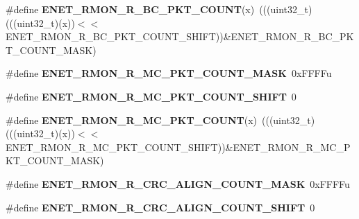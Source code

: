 \begin{DoxyCompactItemize}
\item 
\#define {\bfseries E\+N\+E\+T\+\_\+\+R\+M\+O\+N\+\_\+\+R\+\_\+\+B\+C\+\_\+\+P\+K\+T\+\_\+\+C\+O\+U\+NT}(x)~(((uint32\+\_\+t)(((uint32\+\_\+t)(x))$<$$<$E\+N\+E\+T\+\_\+\+R\+M\+O\+N\+\_\+\+R\+\_\+\+B\+C\+\_\+\+P\+K\+T\+\_\+\+C\+O\+U\+N\+T\+\_\+\+S\+H\+I\+FT))\&E\+N\+E\+T\+\_\+\+R\+M\+O\+N\+\_\+\+R\+\_\+\+B\+C\+\_\+\+P\+K\+T\+\_\+\+C\+O\+U\+N\+T\+\_\+\+M\+A\+SK)\hypertarget{group__ENET__Register__Masks_gad997cfc2457658dabbd489f83129f403}{}\label{group__ENET__Register__Masks_gad997cfc2457658dabbd489f83129f403}

\item 
\#define {\bfseries E\+N\+E\+T\+\_\+\+R\+M\+O\+N\+\_\+\+R\+\_\+\+M\+C\+\_\+\+P\+K\+T\+\_\+\+C\+O\+U\+N\+T\+\_\+\+M\+A\+SK}~0x\+F\+F\+F\+Fu\hypertarget{group__ENET__Register__Masks_gaffc93969b103038343e11847c1dd49f0}{}\label{group__ENET__Register__Masks_gaffc93969b103038343e11847c1dd49f0}

\item 
\#define {\bfseries E\+N\+E\+T\+\_\+\+R\+M\+O\+N\+\_\+\+R\+\_\+\+M\+C\+\_\+\+P\+K\+T\+\_\+\+C\+O\+U\+N\+T\+\_\+\+S\+H\+I\+FT}~0\hypertarget{group__ENET__Register__Masks_ga2bd574ecd5d63b6c391f9db9c33a22f6}{}\label{group__ENET__Register__Masks_ga2bd574ecd5d63b6c391f9db9c33a22f6}

\item 
\#define {\bfseries E\+N\+E\+T\+\_\+\+R\+M\+O\+N\+\_\+\+R\+\_\+\+M\+C\+\_\+\+P\+K\+T\+\_\+\+C\+O\+U\+NT}(x)~(((uint32\+\_\+t)(((uint32\+\_\+t)(x))$<$$<$E\+N\+E\+T\+\_\+\+R\+M\+O\+N\+\_\+\+R\+\_\+\+M\+C\+\_\+\+P\+K\+T\+\_\+\+C\+O\+U\+N\+T\+\_\+\+S\+H\+I\+FT))\&E\+N\+E\+T\+\_\+\+R\+M\+O\+N\+\_\+\+R\+\_\+\+M\+C\+\_\+\+P\+K\+T\+\_\+\+C\+O\+U\+N\+T\+\_\+\+M\+A\+SK)\hypertarget{group__ENET__Register__Masks_ga8407d8b93947fd3cb51d75cbc605c48d}{}\label{group__ENET__Register__Masks_ga8407d8b93947fd3cb51d75cbc605c48d}

\item 
\#define {\bfseries E\+N\+E\+T\+\_\+\+R\+M\+O\+N\+\_\+\+R\+\_\+\+C\+R\+C\+\_\+\+A\+L\+I\+G\+N\+\_\+\+C\+O\+U\+N\+T\+\_\+\+M\+A\+SK}~0x\+F\+F\+F\+Fu\hypertarget{group__ENET__Register__Masks_ga281a3f038fe24ee481f4b620968e402f}{}\label{group__ENET__Register__Masks_ga281a3f038fe24ee481f4b620968e402f}

\item 
\#define {\bfseries E\+N\+E\+T\+\_\+\+R\+M\+O\+N\+\_\+\+R\+\_\+\+C\+R\+C\+\_\+\+A\+L\+I\+G\+N\+\_\+\+C\+O\+U\+N\+T\+\_\+\+S\+H\+I\+FT}~0\hypertarget{group__ENET__Register__Masks_gade379ca6709a28dd3014b9c0062145de}{}\label{group__ENET__Register__Masks_gade379ca6709a28dd3014b9c0062145de}


\end{DoxyCompactItemize}
